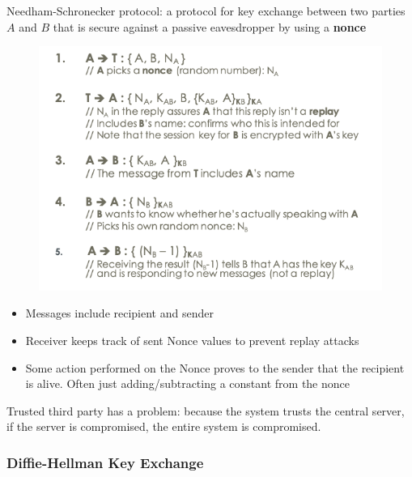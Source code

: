 \documentclass[../notes.tex]{subfiles}
\begin{document}
\begin{definition}
    Needham-Schronecker protocol: a protocol for key exchange between two parties $ A $ and $ B $ that is secure against a passive eavesdropper by using a \textbf{nonce} 

    \begin{figure}[H]
        \centering
        \includegraphics[width=0.8\linewidth]{img/image_2023-02-10-16-55-54.png}
    \end{figure}

    \begin{itemize}
        \item Messages include recipient and sender
        \item Receiver keeps track of sent Nonce values to prevent replay attacks
        \item Some action performed on the Nonce proves to the sender that the recipient is alive. Often just adding/subtracting a constant from the nonce
    \end{itemize}

Trusted third party has a problem: because the system trusts the central server, if the server is compromised, the entire system is compromised.

\end{definition}


\subsubsection{Diffie-Hellman Key Exchange}
\end{document}
